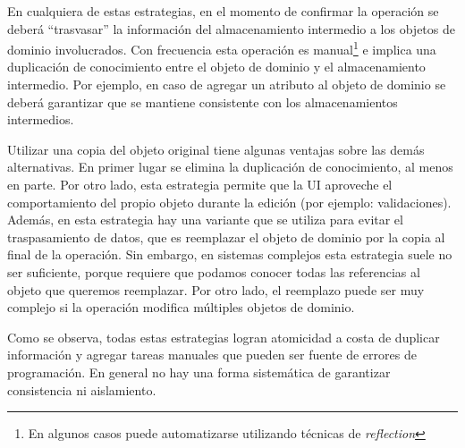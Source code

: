 	En cualquiera de estas estrategias, en el momento de confirmar la operación se
	deberá ``trasvasar'' la información del almacenamiento intermedio a los objetos
	de dominio involucrados.
	Con frecuencia esta operación es manual\footnote{En algunos casos puede automatizarse utilizando
	técnicas de \emph{reflection}} e implica una duplicación de conocimiento entre
	el objeto de dominio y el almacenamiento intermedio. Por ejemplo, en caso de
	agregar un atributo al objeto de dominio se deberá garantizar que se mantiene
	consistente con los almacenamientos intermedios.
	
	Utilizar una copia del objeto original tiene algunas ventajas sobre las demás
	alternativas. En primer lugar se elimina la duplicación de
	conocimiento, al menos en parte. Por otro lado, esta estrategia permite que la
	UI aproveche el comportamiento del propio objeto durante la edición (por
	ejemplo: validaciones). Además, en esta estrategia hay una variante que se
	utiliza para evitar el traspasamiento de datos, que es reemplazar el objeto de
	dominio por la copia al final de la operación. Sin embargo, en sistemas
	complejos esta estrategia suele no ser suficiente, porque requiere que podamos
	conocer todas las referencias al objeto que queremos reemplazar. Por otro lado,
	el reemplazo puede ser muy complejo si la operación modifica múltiples objetos
	de dominio.

	Como se observa, todas estas estrategias logran atomicidad a costa de duplicar
	información y agregar tareas manuales que pueden ser fuente de errores de
	programación. En general no hay una forma sistemática de
	garantizar consistencia ni aislamiento.
	